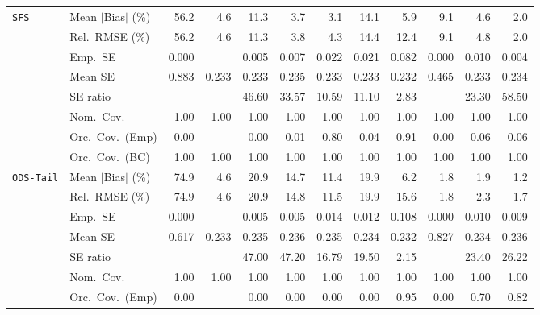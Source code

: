 \begin{landscape}
\begin{longtable}{llrrrrrrrrrr}
\addlinespace[2pt]
\quad \texttt{SFS} & Mean $|$Bias$|$ (\%) & 56.2 & 4.6 & 11.3 & \cellcolor{rankthree}3.7 & \cellcolor{ranktwo}3.1 & 14.1 & 5.9 & 9.1 & 4.6 & \cellcolor{rankone}2.0 \\
 & Rel.\ RMSE (\%) & 56.2 & 4.6 & 11.3 & \cellcolor{ranktwo}3.8 & \cellcolor{rankthree}4.3 & 14.4 & 12.4 & 9.1 & 4.8 & \cellcolor{rankone}2.0 \\
 & Emp.\ SE & 0.000 &  & 0.005 & 0.007 & 0.022 & 0.021 & 0.082 & 0.000 & 0.010 & 0.004 \\
 & Mean SE & 0.883 & 0.233 & 0.233 & 0.235 & 0.233 & 0.233 & 0.232 & 0.465 & 0.233 & 0.234 \\
 & SE ratio &  &  & 46.60 & 33.57 & \cellcolor{ranktwo}10.59 & \cellcolor{rankthree}11.10 & \cellcolor{rankone}2.83 &  & 23.30 & 58.50 \\
 & Nom.\ Cov. & \cellcolor{rankone}1.00 & \cellcolor{ranktwo}1.00 & \cellcolor{rankthree}1.00 & 1.00 & 1.00 & 1.00 & 1.00 & 1.00 & 1.00 & 1.00 \\
 & Orc.\ Cov.\ (Emp) & 0.00 &  & 0.00 & 0.01 & \cellcolor{ranktwo}0.80 & 0.04 & \cellcolor{rankone}0.91 & 0.00 & 0.06 & \cellcolor{rankthree}0.06 \\
 & Orc.\ Cov.\ (BC) & \cellcolor{rankone}1.00 & \cellcolor{ranktwo}1.00 & \cellcolor{rankthree}1.00 & 1.00 & 1.00 & 1.00 & 1.00 & 1.00 & 1.00 & 1.00 \\
\addlinespace[2pt]
\quad \texttt{ODS-Tail} & Mean $|$Bias$|$ (\%) & 74.9 & 4.6 & 20.9 & 14.7 & 11.4 & 19.9 & 6.2 & \cellcolor{ranktwo}1.8 & \cellcolor{rankthree}1.9 & \cellcolor{rankone}1.2 \\
 & Rel.\ RMSE (\%) & 74.9 & 4.6 & 20.9 & 14.8 & 11.5 & 19.9 & 15.6 & \cellcolor{ranktwo}1.8 & \cellcolor{rankthree}2.3 & \cellcolor{rankone}1.7 \\
 & Emp.\ SE & 0.000 &  & 0.005 & 0.005 & 0.014 & 0.012 & 0.108 & 0.000 & 0.010 & 0.009 \\
 & Mean SE & 0.617 & 0.233 & 0.235 & 0.236 & 0.235 & 0.234 & 0.232 & 0.827 & 0.234 & 0.236 \\
 & SE ratio &  &  & 47.00 & 47.20 & \cellcolor{ranktwo}16.79 & \cellcolor{rankthree}19.50 & \cellcolor{rankone}2.15 &  & 23.40 & 26.22 \\
 & Nom.\ Cov. & \cellcolor{ranktwo}1.00 & \cellcolor{rankthree}1.00 & 1.00 & 1.00 & 1.00 & 1.00 & \cellcolor{rankone}1.00 & 1.00 & 1.00 & 1.00 \\
 & Orc.\ Cov.\ (Emp) & 0.00 &  & 0.00 & 0.00 & 0.00 & 0.00 & \cellcolor{rankone}0.95 & 0.00 & \cellcolor{rankthree}0.70 & \cellcolor{ranktwo}0.82 \\

\end{longtable}
\end{landscape}
